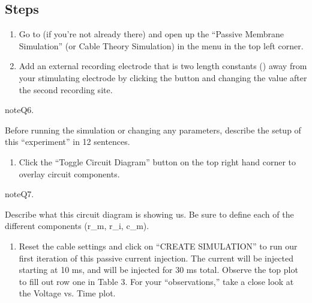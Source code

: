 \documentclass[letterpaper,10pt,english]{jupyterBook}
\begin{document}
\subsection{Steps}
\label{\detokenize{ModelingNeuralMembranes:id1}}\begin{enumerate}
%
\item {} 
\sphinxAtStartPar
Go to   (if you’re not already there) and open up the “Passive Membrane Simulation” (or Cable Theory Simulation)  in the menu in the top left corner.

\item {} 
\sphinxAtStartPar
Add an external recording electrode that is two length constants () away from your stimulating electrode by clicking the \sphinxstylestrong{+} button and changing the value after the second recording site. 

\end{enumerate}

\begin{sphinxadmonition}{note}{Q6.}

\sphinxAtStartPar
Before running the simulation or changing any parameters, describe the setup of this “experiment” in 1\sphinxhyphen{}2 sentences.
\end{sphinxadmonition}
\begin{enumerate}
%
\setcounter{enumi}{2}
\item {} 
\sphinxAtStartPar
Click the “Toggle Circuit Diagram” button on the top right hand corner to overlay circuit components. 

\end{enumerate}

\begin{sphinxadmonition}{note}{Q7.}

\sphinxAtStartPar
Describe what this circuit diagram is showing us. Be sure to define each of the different components (r\_m, r\_i, c\_m).
\end{sphinxadmonition}
\begin{enumerate}
%
\setcounter{enumi}{3}
\item {} 
\sphinxAtStartPar
Re\sphinxhyphen{}set the cable settings and click on “CREATE SIMULATION” to run our first iteration of this passive current injection. The current will be injected starting at 10 ms, and will be injected for 30 ms total. Observe the top plot to fill out row one in Table 3. For your “observations,” take a close look at the Voltage vs. Time plot. 

\end{enumerate}
\end{document}
